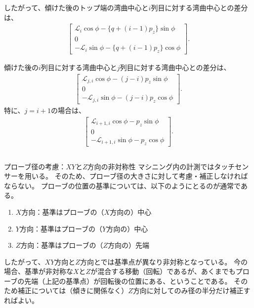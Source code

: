 したがって、傾けた後のトップ端の湾曲中心と$i$列目に対する湾曲中心との差分は、
\begin{align}
  \label{eq:afterPhidimpleCenterDistance}
  \left[
  \begin{array}{c}
    \mathcal L_i\cos\phi-\{q+(i-1)p_z\}\sin\phi\\
    0\\
    -\mathcal L_i\sin\phi-\{q+(i-1)p_z\}\cos\phi
  \end{array}
  \right].
\end{align}
\begin{hosoku}
傾けた後の$i$列目に対する湾曲中心と$j$列目に対する湾曲中心との差分は、
\begin{align*}
  \left[
  \begin{array}{c}
    \mathcal L_{j,i}\cos\phi-(j-i)p_z\sin\phi\\
    0\\
    -\mathcal L_{j,i}\sin\phi-(j-i)p_z\cos\phi
  \end{array}
  \right].
\end{align*}
特に、$j = i+1$の場合は、
\begin{align*}
  \left[
  \begin{array}{c}
    \mathcal L_{i+1,i}\cos\phi-p_z\sin\phi\\
    0\\
    -\mathcal L_{i+1,i}\sin\phi-p_z\cos\phi
  \end{array}
  \right].
\end{align*}
\end{hosoku}
\begin{Column}{プローブ径の考慮：$XY$と$Z$方向の非対称性}
マシニング内の計測ではタッチセンサーを用いる。
そのため、プローブ径の大きさに対して考慮・補正しなければならない。
プローブの位置の基準については、以下のようにとるのが通常である。
\begin{enumerate}
\item $X$方向：基準はプローブの（$X$方向の）中心
\item $Y$方向：基準はプローブの（$Y$方向の）中心
\item $Z$方向：基準はプローブの（$Z$方向の）先端
\end{enumerate}
したがって、$XY$方向と$Z$方向とでは基準点が異なり非対称となっている。
今の場合、基準が非対称な$X$と$Z$が混合する移動（回転）であるが、あくまでもプローブの先端（上記の基準点）が回転後の位置にある、ということである。
そのため補正については（傾きに関係なく）$Z$方向に対してのみ径の半分だけ補正すればよい。
\end{Column}
